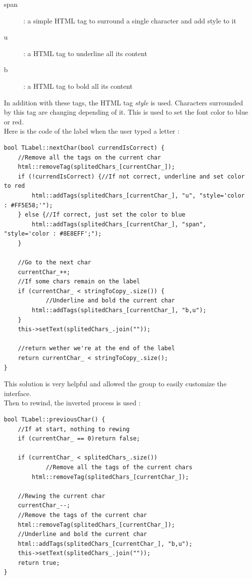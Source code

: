 \begin{description}
	\item[span] : a simple HTML tag to surround a single character and add style to it
	\item[u] : a HTML tag to underline all its content
	\item[b] : a HTML tag to bold all its content
\end{description}

In addition with these tags, the HTML tag \textit{style} is used. Characters surrounded by this tag are changing depending of it. This is used to set the font color to blue or red.\\
Here is the code of the label when the user typed a letter :
\begin{lstlisting}
bool TLabel::nextChar(bool currendIsCorrect) {
	//Remove all the tags on the current char
    html::removeTag(splitedChars_[currentChar_]);
    if (!currendIsCorrect) {//If not correct, underline and set color to red
        html::addTags(splitedChars_[currentChar_], "u", "style='color : #FF5E58;'");
    } else {//If correct, just set the color to blue
        html::addTags(splitedChars_[currentChar_], "span", "style='color : #8E8EFF';");
    }

	//Go to the next char
    currentChar_++;
    //If some chars remain on the label
    if (currentChar_ < stringToCopy_.size()) {
    		//Underline and bold the current char
        html::addTags(splitedChars_[currentChar_], "b,u");
    }
    this->setText(splitedChars_.join(""));

	//return wether we're at the end of the label
    return currentChar_ < stringToCopy_.size();
}
\end{lstlisting}
This solution is very helpful and allowed the group to easily customize the interface.\\
Then to rewind, the inverted process is used :
\begin{lstlisting}
bool TLabel::previousChar() {
	//If at start, nothing to rewing
    if (currentChar_ == 0)return false;

    if (currentChar_ < splitedChars_.size())
    		//Remove all the tags of the current chars
        html::removeTag(splitedChars_[currentChar_]);

	//Rewing the current char
    currentChar_--;
    //Remove the tags of the current char
    html::removeTag(splitedChars_[currentChar_]);
    //Underline and bold the current char
    html::addTags(splitedChars_[currentChar_], "b,u");
    this->setText(splitedChars_.join(""));
    return true;
}

\end{lstlisting}
